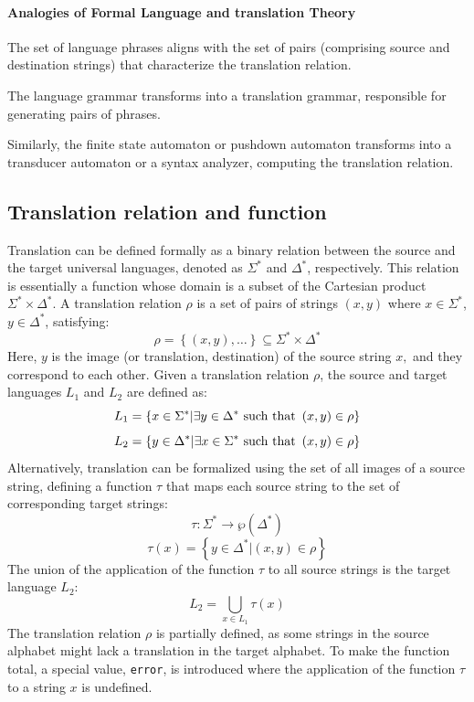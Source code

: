 \paragraph*{Analogies of Formal Language and translation Theory}
The set of language phrases aligns with the set of pairs (comprising source and destination strings) that characterize the translation relation.

The language grammar transforms into a translation grammar, responsible for generating pairs of phrases.

Similarly, the finite state automaton or pushdown automaton transforms into a transducer automaton or a syntax analyzer, computing the translation relation.

\subsection{Translation relation and function}
Translation can be defined formally as a binary relation between the source and the target universal languages, denoted as $\Sigma^{*}$ and $\Delta^{*}$, respectively. 
This relation is essentially a function whose domain is a subset of the Cartesian product $\Sigma^{*} \times \Delta^{*}$.
A translation relation $\rho$ is a set of pairs of strings $\left( x, y \right)$ where $x \in \Sigma^{*}$, $y \in \Delta^{*}$, satisfying:
\[ \rho = \left\{ \left( x, y \right),\dots \right\} \subseteq \Sigma^{*} \times \Delta^{*} \]
Here, $y$ is the image (or translation, destination) of the source string $x, $ and they correspond to each other.
Given a translation relation $\rho$, the source and target languages $L_1$ and $L_2$ are defined as:
\[L_1 = \left\{ x \in \Sigma^{*} | \exists y \in \Delta^{*} \textnormal{ such that } \left( x, y \right) \in \rho \right\}\]
\[L_2 = \left\{ y \in \Delta^{*} | \exists x \in \Sigma^{*} \textnormal{ such that } \left( x, y \right) \in \rho \right\}\]
Alternatively, translation can be formalized using the set of all images of a source string, defining a function $\tau$ that maps each source string to the set of corresponding target strings:
\[\tau: \Sigma^{*} \rightarrow \wp \left( \Delta^{*} \right)\]
\[\tau(x) = \left\{ y \in \Delta^{*} | \left( x, y \right) \in \rho \right\}\]
The union of the application of the function $\tau$ to all source strings is the target language $L_2$:
\[ L_2 = \bigcup_{x \in L_1} \tau(x) \]
The translation relation $\rho$ is partially defined, as some strings in the source alphabet might lack a translation in the target alphabet.
To make the function total, a special value, \texttt{error}, is introduced where the application of the function $\tau$ to a string $x$ is undefined.
